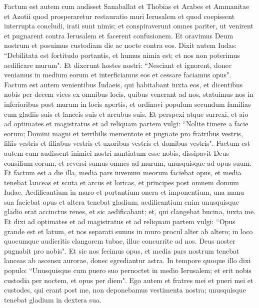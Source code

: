 \begin{biblechapter}  
\verse Factum est autem cum audisset Sanaballat et Thobias et Arabes et Ammanitae et Azotii quod prosperaretur restauratio muri Ierusalem et quod coepissent interrupta concludi, irati sunt nimis; 
\verse et conspiraverunt omnes pariter, ut venirent et pugnarent contra Ierusalem et facerent confusionem.  
\verse Et oravimus Deum nostrum et posuimus custodiam die ac nocte contra eos. 
\verse Dixit autem Iudas: “Debilitata est fortitudo portantis, et humus nimia est; et nos non poterimus aedificare murum". 
\verse Et dixerunt hostes nostri: “Nesciant et ignorent, donec veniamus in medium eorum et interficiamus eos et cessare faciamus opus". 
\verse Factum est autem venientibus Iudaeis, qui habitabant iuxta eos, et dicentibus nobis per decem vices ex omnibus locis, quibus venerant ad nos, 
\verse statuimus nos in inferioribus post murum in locis apertis, et ordinavi populum secundum familias cum gladiis suis et lanceis suis et arcubus suis. 
\verse Et perspexi atque surrexi, et aio ad optimates et magistratus et ad reliquam partem vulgi: “Nolite timere a facie eorum; Domini magni et terribilis mementote et pugnate pro fratribus vestris, filiis vestris et filiabus vestris et uxoribus vestris et domibus vestris". 
\verse Factum est autem cum audissent inimici nostri nuntiatum esse nobis, dissipavit Deus consilium eorum, et reversi sumus omnes ad murum, unusquisque ad opus suum. 
\verse Et factum est a die illa, media pars iuvenum meorum faciebat opus, et media tenebat lanceas et scuta et arcus et loricas, et principes post omnem domum Iudae. 
\verse Aedificantium in muro et portantium onera et imponentium, una manu sua faciebat opus et altera tenebat gladium;  
\verse aedificantium enim unusquisque gladio erat accinctus renes, et sic aedificabant; et, qui clangebat bucina, iuxta me. 
\verse Et dixi ad optimates et ad magistratus et ad reliquam partem vulgi: “Opus grande est et latum, et nos separati sumus in muro procul alter ab altero; 
\verse in loco quocumque audieritis clangorem tubae, illuc concurrite ad nos. Deus noster pugnabit pro nobis". 
\verse Et sic nos fecimus opus, et media pars nostrum tenebat lanceas ab ascensu aurorae, donec egrediantur astra. 
\verse In tempore quoque illo dixi populo: “Unusquisque cum puero suo pernoctet in medio Ierusalem; et erit nobis custodia per noctem, et opus per diem". 
\verse Ego autem et fratres mei et pueri mei et custodes, qui erant post me, non deponebamus vestimenta nostra; unusquisque tenebat gladium in dextera sua. 
\end{biblechapter}

